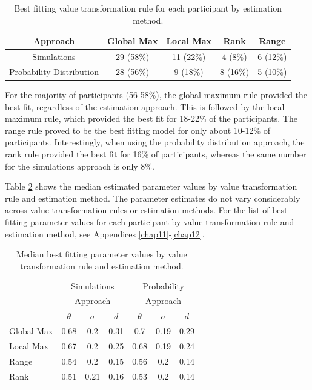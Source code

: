 \documentclass[11pt,a4paper]{article}
\begin{document}
 
\begin{table}[ht]
\caption{Best fitting value transformation rule for each participant by estimation method.}
\centering
\begin{tabular}{ccccc}   

\toprule Approach  & Global Max    & Local Max & Rank & Range \\ 
\midrule Simulations  &  29 (58\%) & 11 (22\%)  & 4 (8\%)   & 6 (12\%) \\
       Probability Distribution & 28 (56\%)  &    9 (18\%)    & 8 (16\%)   & 5  (10\%)  \\
\bottomrule 
\end{tabular}
\label{table:chap1res}
\end{table}

For the majority of participants (56-58\%), the global maximum rule provided the best fit, regardless of the estimation approach. This is followed by the local maximum rule, which provided the best fit for 18-22\% of the participants. The range rule proved to be the best fitting model for only about 10-12\% of participants. Interestingly, when using the probability distribution approach, the rank rule provided the best fit for 16\% of participants, whereas the same number for the simulations approach is only 8\%. 

Table \ref{table:chap1res2} shows the median estimated parameter values by value transformation rule and estimation method. The parameter estimates do not vary considerably across value transformation rules or estimation methods. For the list of  best fitting parameter values for each participant by value transformation rule and estimation method, see Appendices \ref{chap11}-\ref{chap12}.

\begin{table}[h]
\centering
\caption{Median best fitting parameter values by value transformation rule and estimation method.}
\begin{tabular}{lcccccc}
\toprule 
\multirow{2}{*}{} & \multicolumn{3}{c}{Simulations} & \multicolumn{3}{c}{Probability} \\
\multirow{2}{*}{} & \multicolumn{3}{c}{Approach} & \multicolumn{3}{c}{Approach} \\

\cmidrule(l){2-4} \cmidrule(l){5-7}
 & $\theta$ & $\sigma$ & $d$ & $\theta$ & $\sigma$ & $d$ \\
\midrule
Global Max & 0.68 & 0.2  & 0.31 & 0.7 & 0.19 & 0.29 \\
Local Max & 0.67 & 0.2 & 0.25 & 0.68 & 0.19 & 0.24\\
Range & 0.54 & 0.2 & 0.15 & 0.56 & 0.2 & 0.14\\
Rank & 0.51 & 0.21 & 0.16 & 0.53 & 0.2 & 0.14\\
\bottomrule
\end{tabular}
\label{table:chap1res2}
\end{table}
\end{document}
